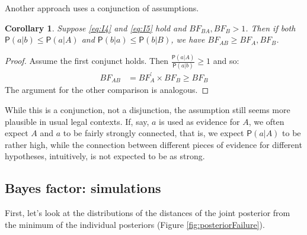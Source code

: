 \documentclass[
  10pt,
  dvipsnames,enabledeprecatedfontcommands]{scrartcl}
\newcommand{\pr}[1]{\ensuremath{\mathsf{P}(#1)}}
\newtheorem{corollary}{Corollary}[fact]
\begin{document}
Another approach uses a conjunction of assumptions.

\begin{corollary} Suppose \eqref{eq:I4} and \eqref{eq:I5}  hold and $BF_{BA}, BF_{B} >1$. 
Then if both $\pr{a\vert b} \leq \pr{a \vert A}$ and \linebreak  $\pr{b \vert a} \leq \pr{b\vert B}$, we have $BF_{AB}\geq BF_{A}, BF_{B}$. \label{cor:BFweaker2}
\end{corollary}

\begin{proof}
Assume the first conjunct holds. Then $\frac{\pr{a\vert A}}{\pr{a\vert b}} \geq 1$ and so:
\begin{align*}
BF_{AB} &= BF^{'}_{A} \times BF_{B} \geq BF_{B}
\end{align*}
\noindent The argument for the other comparison is analogous.
\end{proof}

While this is a conjunction, not a disjunction, the assumption still
seems more plausible in usual legal contexts. If, say, \(a\) is used as
evidence for \(A\), we often expect \(A\) and \(a\) to be fairly
strongly connected, that is, we expect \(\pr{a\vert A}\) to be rather
high, while the connection between different pieces of evidence for
different hypotheses, intuitively, is not expected to be as strong.

\hypertarget{bayes-factor-simulations}{%
\subsection*{Bayes factor: simulations}\label{bayes-factor-simulations}}

First, let's look at the distributions of the distances of the joint
posterior from the minimum of the individual posteriors (Figure
\ref{fig:posteriorFailure}).
\end{document}
